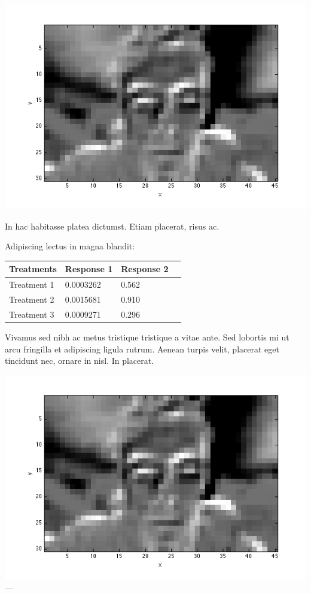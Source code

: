 \documentclass[a0,landscape]{a0poster}
\begin{document}
\begin{multicols}{4}
\begin{center}\vspace{1cm}
\includegraphics[width=0.8\linewidth]{images/red_trough.png}
\end{center}\vspace{1cm}

In hac habitasse platea dictumst. Etiam placerat, risus ac.

Adipiscing lectus in magna blandit:

\begin{center}\vspace{1cm}
\begin{tabular}{l l l l}
\toprule
\textbf{Treatments} & \textbf{Response 1} & \textbf{Response 2} \\
\midrule
Treatment 1 & 0.0003262 & 0.562 \\
Treatment 2 & 0.0015681 & 0.910 \\
Treatment 3 & 0.0009271 & 0.296 \\
\bottomrule
\end{tabular}
\end{center}\vspace{1cm}

Vivamus sed nibh ac metus tristique tristique a vitae ante. Sed lobortis mi ut arcu fringilla et adipiscing ligula rutrum. Aenean turpis velit, placerat eget tincidunt nec, ornare in nisl. In placerat.

\begin{center}\vspace{1cm}
\includegraphics[width=0.8\linewidth]{images/red_trough.png}
---
\end{center}\vspace{1cm}


\end{multicols}
\end{document}
